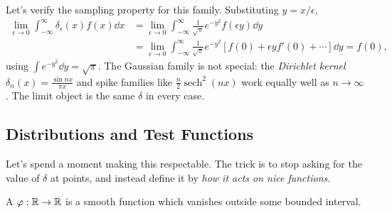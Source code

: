 \documentclass[a4paper]{scrartcl}
\begin{document}
\begin{center}
\end{center}

Let's verify the sampling property for this family. Substituting $y = x/\epsilon$,
\begin{align*}
    \lim_{\epsilon \to 0}\int_{-\infty}^{\infty} \delta_\epsilon(x) f(x) \dd x
    &= \lim_{\epsilon \to 0} \int_{-\infty}^{\infty} \frac{1}{\sqrt{\pi}} e^{-y^2} f(\epsilon y) \dd y \\
    &= \lim_{\epsilon \to 0}\int_{-\infty}^{\infty} \frac{1}{\sqrt{\pi}} e^{-y^2}\left[f(0) + \epsilon y f'(0) + \cdots \right] \dd y = f(0),
\end{align*}
using $\int e^{-y^2} \dd y = \sqrt{\pi}$. The Gaussian family is not special: the \emph{Dirichlet kernel} $\delta_n(x) = \frac{\sin nx}{\pi x}$ and spike families like $\frac{n}{2}\operatorname{sech}^2 (nx)$ work equally well as $n \to \infty$. The limit object is the same $\delta$ in every case.

\subsection{Distributions and Test Functions}

Let's spend a moment making this respectable. The trick is to stop asking for the value of $\delta$ at points, and instead define it by \emph{how it acts on nice functions}.

\begin{definition}
    A  $\varphi : \mathbb{R} \rightarrow \mathbb{R}$ is a smooth function which vanishes outside some bounded interval.
\end{definition}
\end{document}
